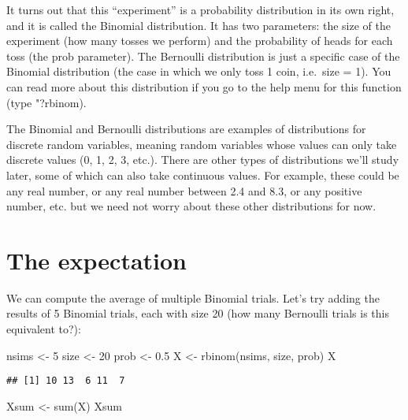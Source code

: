 \documentclass[
]{book}
\newenvironment{Shaded}{\begin{snugshade}}{\end{snugshade}}
\newcommand{\DecValTok}[1]{\textcolor[rgb]{0.00,0.00,0.81}{#1}}
\newcommand{\FloatTok}[1]{\textcolor[rgb]{0.00,0.00,0.81}{#1}}
\newcommand{\FunctionTok}[1]{\textcolor[rgb]{0.00,0.00,0.00}{#1}}
\newcommand{\NormalTok}[1]{#1}
\newcommand{\OtherTok}[1]{\textcolor[rgb]{0.56,0.35,0.01}{#1}}
\begin{document}
It turns out that this ``experiment'' is a probability distribution in its own right, and it is called the Binomial distribution. It has two parameters: the size of the experiment (how many tosses we perform) and the probability of heads for each toss (the prob parameter). The Bernoulli distribution is just a specific case of the Binomial distribution (the case in which we only toss 1 coin, i.e.~size = 1). You can read more about this distribution if you go to the help menu for this function (type "?rbinom).

The Binomial and Bernoulli distributions are examples of distributions for discrete random variables, meaning random variables whose values can only take discrete values (0, 1, 2, 3, etc.). There are other types of distributions we'll study later, some of which can also take continuous values. For example, these could be any real number, or any real number between 2.4 and 8.3, or any positive number, etc. but we need not worry about these other distributions for now.

\hypertarget{the-expectation}{%
\section{The expectation}\label{the-expectation}}

We can compute the average of multiple Binomial trials. Let's try adding the results of 5 Binomial trials, each with size 20 (how many Bernoulli trials is this equivalent to?):

\begin{Shaded}
\begin{Highlighting}[]
\NormalTok{nsims }\OtherTok{\textless{}{-}} \DecValTok{5}
\NormalTok{size }\OtherTok{\textless{}{-}} \DecValTok{20}
\NormalTok{prob }\OtherTok{\textless{}{-}} \FloatTok{0.5}
\NormalTok{X }\OtherTok{\textless{}{-}} \FunctionTok{rbinom}\NormalTok{(nsims, size, prob)}
\NormalTok{X}
\end{Highlighting}
\end{Shaded}

\begin{verbatim}
## [1] 10 13  6 11  7
\end{verbatim}

\begin{Shaded}
\begin{Highlighting}[]
\NormalTok{Xsum }\OtherTok{\textless{}{-}} \FunctionTok{sum}\NormalTok{(X)}
\NormalTok{Xsum}
\end{Highlighting}
\end{Shaded}
\end{document}
